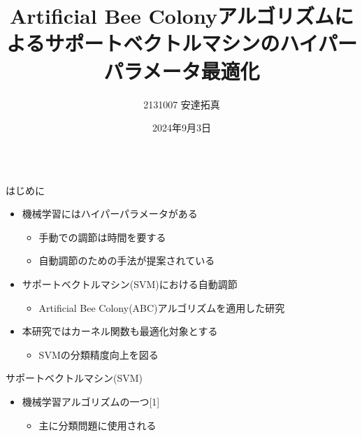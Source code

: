 \documentclass[12pt, cjk, dvipdfmx]{beamer}
\title{Artificial Bee Colonyアルゴリズムによるサポートベクトルマシンのハイパーパラメータ最適化}
\author{2131007 安達拓真}
\institute{千葉工業大学 情報科学部 情報工学科 4年}
\date{2024年9月3日}
\begin{document}
  \begin{frame}
  \vspace{-1.4cm}
    \begin{columns}[t]
        \begin{column}{0.490\linewidth}
            \begin{mybox}{はじめに}
                \begin{itemize}
                  \item 機械学習にはハイパーパラメータがある
                  \begin{itemize}
                    \item 手動での調節は時間を要する
                    \item 自動調節のための手法が提案されている
                  \end{itemize}
                  \item サポートベクトルマシン(SVM)における自動調節
                  \begin{itemize}
                    \item Artificial Bee Colony(ABC)アルゴリズムを適用した研究
                  \end{itemize}
                  \item 本研究ではカーネル関数も最適化対象とする
                  \begin{itemize}
                    \item SVMの分類精度向上を図る
                  \end{itemize}
                \end{itemize}
            \end{mybox}
            \begin{mybox}{サポートベクトルマシン(SVM)}
                \begin{itemize}
                  \item 機械学習アルゴリズムの一つ[1]
                  \begin{itemize}
                    \item 主に分類問題に使用される
                  \end{itemize}
                  

\end{itemize}
\end{mybox}
\end{column}
\end{columns}
\end{frame}
\end{document}
